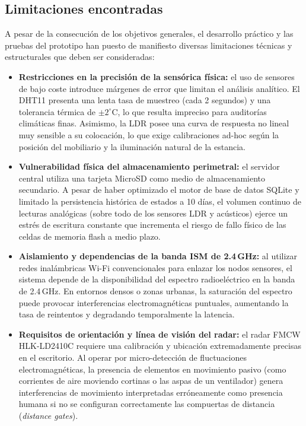 \subsection{Limitaciones encontradas}

A pesar de la consecución de los objetivos generales, el desarrollo práctico y las pruebas del prototipo han puesto de manifiesto diversas limitaciones técnicas y estructurales que deben ser consideradas:

\begin{itemize}
    \item \textbf{Restricciones en la precisión de la sensórica física:} el uso de sensores de bajo coste introduce márgenes de error que limitan el análisis analítico. El DHT11 presenta una lenta tasa de muestreo (cada 2 segundos) y una tolerancia térmica de $\pm 2^\circ\text{C}$, lo que resulta impreciso para auditorías climáticas finas. Asimismo, la LDR posee una curva de respuesta no lineal muy sensible a su colocación, lo que exige calibraciones ad-hoc según la posición del mobiliario y la iluminación natural de la estancia.
    \item \textbf{Vulnerabilidad física del almacenamiento perimetral:} el servidor central utiliza una tarjeta MicroSD como medio de almacenamiento secundario. A pesar de haber optimizado el motor de base de datos SQLite y limitado la persistencia histórica de estados a 10 días, el volumen continuo de lecturas analógicas (sobre todo de los sensores LDR y acústicos) ejerce un estrés de escritura constante que incrementa el riesgo de fallo físico de las celdas de memoria flash a medio plazo.
    \item \textbf{Aislamiento y dependencias de la banda ISM de 2.4\,GHz:} al utilizar redes inalámbricas Wi-Fi convencionales para enlazar los nodos sensores, el sistema depende de la disponibilidad del espectro radioeléctrico en la banda de 2.4\,GHz. En entornos densos o zonas urbanas, la saturación del espectro puede provocar interferencias electromagnéticas puntuales, aumentando la tasa de reintentos y degradando temporalmente la latencia.
    \item \textbf{Requisitos de orientación y línea de visión del radar:} el radar FMCW HLK-LD2410C requiere una calibración y ubicación extremadamente precisas en el escritorio. Al operar por micro-detección de fluctuaciones electromagnéticas, la presencia de elementos en movimiento pasivo (como corrientes de aire moviendo cortinas o las aspas de un ventilador) genera interferencias de movimiento interpretadas erróneamente como presencia humana si no se configuran correctamente las compuertas de distancia (\textit{distance gates}).
\end{itemize}

